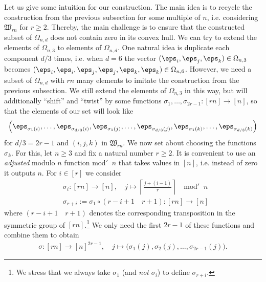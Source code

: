 Let us give some intuition for our construction. The main idea is to recycle the construction from the previous subsection for some multiple of $n$, i.e. considering $\mathfrak{W}_{rn}$ for $r \geq 2$. Thereby, the main challenge is to ensure that the constructed subset of $\Omega_{n,d}$ does not contain zero in its convex hull. We can try to extend the elements of $\Omega_{n,3}$ to elements of $\Omega_{n,d}$. One natural idea is duplicate each component $d/3$ times, i.e. when $d=6$ the vector $(\eps_i, \eps_j, \eps_k) \in \Omega_{n,3}$ becomes $(\eps_i, \eps_i, \eps_j, \eps_j, \eps_k, \eps_k) \in \Omega_{n,6}$. However, we need a subset of $\Omega_{n,d}$ with $rn$ many elements to imitate the construction from the previous subsection. We still extend the elements of $\Omega_{n,3}$ in this way, but will additionally ``shift'' and ``twist'' by some functions $\sigma_1, \dots, \sigma_{2r-1} \colon [rn] \to [n]$, so that the elements of our set will look like 
$$
\left( \eps_{\sigma_1(i)}, \ldots, \eps_{\sigma_{d/3}(i)},
	\eps_{\sigma_1(j)}, \ldots, \eps_{\sigma_{d/3}(j)}, \eps_{\sigma_1(k)}, \ldots, \eps_{\sigma_{d/3}(k)} \right)
  $$
for $d/3 = 2r-1$ and $(i,j,k)$ in $\mathfrak{W}_{rn}$. We now set about choosing the functions $\sigma_k$. For this, let $n \geq 3$ and fix a natural number $r \geq 2$. It is convenient to use an \emph{adjusted} modulo $n$ function $\mathrm{mod}' \;\; n$ that takes values in $[n]$, i.e. instead of zero it outputs $n$.
For $i \in [r]$ we consider
	\begin{align*}
	&\sigma_{i} \colon [r n] \to [n], \quad j \mapsto \left\lceil \frac{j + (i-1)}{r} \right\rceil \quad \mathrm{mod}' \;\; n \\
	&\sigma_{r + i} := \sigma_1 \circ (r - i + 1 \quad r + 1) \colon [rn] \to [n]
	\end{align*}
where $(r - i + 1 \quad r + 1)$ denotes the corresponding transposition in the symmetric group of $[rn]$.\footnote{We stress that we always take $\sigma_1$ (and \emph{not} $\sigma_i$) to define $\sigma_{r+i}$.} We only need the first $2 r - 1$ of these functions and combine them to obtain 
	\begin{align*}
	\sigma \colon [r n] \to [n]^{2 r - 1}, \quad j \mapsto \big( \sigma_1(j), \sigma_2(j),\ldots, \sigma_{2 r - 1}(j) \big).
	\end{align*}


